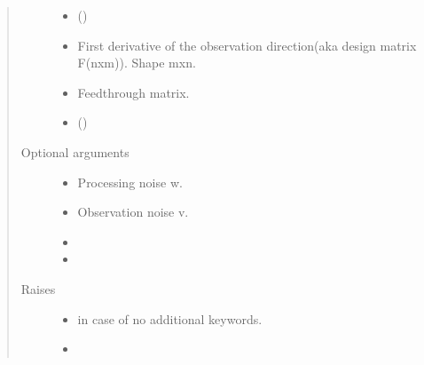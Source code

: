 \documentclass[letterpaper,10pt,english]{sphinxmanual}
\begin{document}
\begin{fulllineitems}
\begin{quote}
\begin{description}
\begin{itemize}
\item {} 
\sphinxAtStartPar
{} () \textendash{} 

\item {} 
\sphinxAtStartPar
{} \textendash{} First derivative of the observation
direction(aka design matrix F(nxm)). Shape mxn.

\item {} 
\sphinxAtStartPar
{} \textendash{} Feedthrough matrix.

\item {} 
\sphinxAtStartPar
{} () \textendash{} 

\end{itemize}

\item[{Optional arguments}] \leavevmode\begin{itemize}
\item {} 
\sphinxAtStartPar
{} \textendash{} Processing noise w.

\item {} 
\sphinxAtStartPar
{} \textendash{} Observation noise v.

\item {} 
\sphinxAtStartPar
{}

\item {} 
\sphinxAtStartPar
{}

\end{itemize}

\item[{Raises}] \leavevmode\begin{itemize}
\item {} 
\sphinxAtStartPar
{} \textendash{} in case of no additional keywords.

\item {} 
\sphinxAtStartPar
{} \textendash{} 


\end{itemize}
\end{description}
\end{quote}
\end{fulllineitems}
\end{document}
